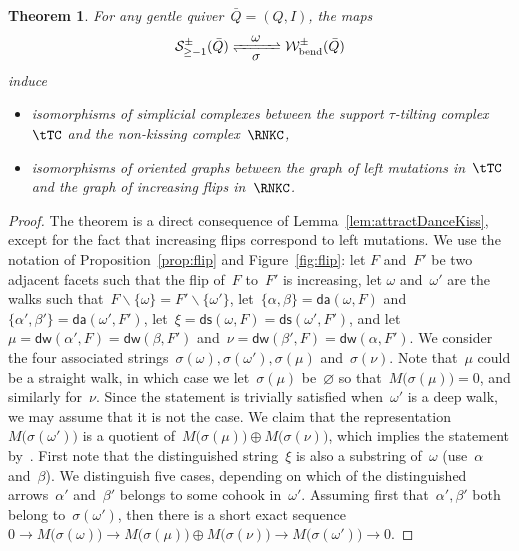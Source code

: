 \documentclass{amsart}
\newtheorem{theorem}{Theorem}[part]
\theoremstyle{definition}
\newcommand{\ssm}{\smallsetminus} %
\newcommand{\strings}{\mathcal{S}} %
\newcommand{\bendingWalks}{\mathcal{W}_\mathrm{bend}} %
\newcommand{\distinguishedWalk}[2]{\mathsf{dw}(#1,#2)} %
\newcommand{\distinguishedArrows}[2]{\mathsf{da}(#1,#2)} %
\newcommand{\distinguishedString}[2]{\mathsf{ds}(#1,#2)} %
\begin{document}
\begin{theorem}
\label{thm:nkc/sttiltc}
For any gentle quiver~$\bar Q = (Q,I)$, the maps
\[
\strings_{\ge-1}^\pm(\bar Q) \xrightleftharpoons[\quad\mbox{$\sigma$}\;\quad]{\mbox{$\omega$}} \bendingWalks^\pm(\bar Q)
\]
induce
\begin{itemize}
\item isomorphisms of simplicial complexes between the support $\tau$-tilting complex~$\tTC$ and the non-kissing complex~$\RNKC$,
\item isomorphisms of oriented graphs between the graph of left mutations in~$\tTC$ and the graph of increasing flips in~$\RNKC$.
\end{itemize}
\end{theorem}

\begin{proof}
The theorem is a direct consequence of Lemma~\ref{lem:attractDanceKiss}, except for the fact that increasing flips correspond to left mutations.
We use the notation of Proposition~\ref{prop:flip} and Figure~\ref{fig:flip}: let $F$ and~$F'$ be two adjacent facets such that the flip of~$F$ to~$F'$ is increasing, let $\omega$ and~$\omega'$ are the walks such that~$F \ssm \{\omega\} = F' \ssm \{\omega'\}$, let~$\{\alpha, \beta\} = \distinguishedArrows{\omega}{F}$ and~$\{\alpha', \beta'\} = \distinguishedArrows{\omega'}{F'}$, let~$\xi = \distinguishedString{\omega}{F} = \distinguishedString{\omega'}{F'}$, and let~$\mu = \distinguishedWalk{\alpha'}{F} = \distinguishedWalk{\beta}{F'}$ and~$\nu = \distinguishedWalk{\beta'}{F} = \distinguishedWalk{\alpha}{F'}$.
We consider the four associated strings~$\sigma(\omega), \sigma(\omega'), \sigma(\mu)$ and~$\sigma(\nu)$.
Note that~$\mu$ could be a straight walk, in which case we let~$\sigma(\mu)$ be~$\varnothing$ so that~$M \big( \sigma(\mu) \big) = 0$, and similarly for~$\nu$.
Since the statement is trivially satisfied when~$\omega'$ is a deep walk, we may assume that it is not the case.
We claim that the representation~$M \big( \sigma(\omega') \big)$ is a quotient of~$M \big( \sigma(\mu) \big) \oplus M \big( \sigma(\nu) \big)$, which implies the statement by~\cite[Def.--Prop.~2.28]{AdachiIyamaReiten}.
First note that the distinguished string~$\xi$ is also a substring of~$\omega$ (use~$\alpha$ and~$\beta$).
We distinguish five cases, depending on which of the distinguished arrows~$\alpha'$ and~$\beta'$ belongs to some cohook in~$\omega'$.
Assuming first that~$\alpha', \beta'$ both belong to~$\sigma(\omega')$, then there is a short exact sequence~$0\rightarrow M \big( \sigma(\omega) \big) \rightarrow M \big( \sigma(\mu) \big) \oplus M \big( \sigma(\nu) \big) \rightarrow M \big( \sigma(\omega') \big) \rightarrow 0$.

\end{proof}
\end{document}
